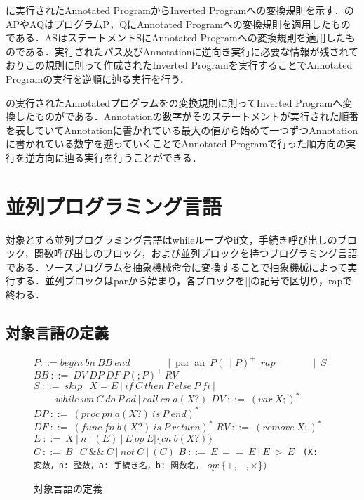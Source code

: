 \documentclass[submit,PRO]{ipsj}
\def\|{\verb|}
\begin{document}
に実行されたAnnotated ProgramからInverted Programへの変換規則を示す．のAPやAQはプログラムP，QにAnnotated Programへの変換規則を適用したものである．ASはステートメントSにAnnotated Programへの変換規則を適用したものである．実行されたパス及びAnnotationに逆向き実行に必要な情報が残されておりこの規則に則って作成されたInverted Programを実行することでAnnotated Programの実行を逆順に辿る実行を行う．




の実行されたAnnotatedプログラムをの変換規則に則ってInverted Programへ変換したものがである．Annotationの数字がそのステートメントが実行された順番を表していてAnnotationに書かれている最大の値から始めて一つずつAnnotationに書かれている数字を遡っていくことでAnnotated Programで行った順方向の実行を逆方向に辿る実行を行うことができる．

%3
\section{並列プログラミング言語}

対象とする並列プログラミング言語はwhileループやif文，手続き呼び出しのブロック，関数呼び出しのブロック，および並列ブロックを持つプログラミング言語である．ソースプログラムを抽象機械命令に変換することで抽象機械によって実行する．並列ブロックはparから始まり，各ブロックを$||$の記号で区切り，rapで終わる．

\subsection{対象言語の定義}
\label{sec:3.1}

\begin{figure}[tb]
\vbox{
\hbox{$P ::= begin\ bn\ BB\ end$}
\hbox{\ \ \ \ \ \ \ $|$ par an $P(\parallel P)^+$ $rap$}
\hbox{\ \ \ \ \ \ \ $|$ $S$}
\hbox{$BB\ ::=\ DV\ DP\ DF\ P(;P)^+\ RV$}
\hbox{$S\ ::=\ skip\ |\  X = E\ |\ if\ C\ then\ P\ else\ P\ fi\ |$}
\hbox{$\ \ \ \ \ \ \ \ \ \  while\ wn\ C\ do\ P\ od\ |\ call\ cn\ a(X?)$}
\hbox{$DV\ ::=\ (var\ X;)^*$}
\hbox{$DP\ ::=\ (proc\ pn\ a(X?)\ is\ P\ end)^*$}
\hbox{$DF\ ::=\ (func\ fn\ b(X?)\ is\ P\ return)^*$}
\hbox{$RV\ ::=\ (remove\ X;)^*$}
\hbox{$E\ ::=\ X\ |\ n\ |\ (E)\ |\ E\ op\ E | \{cn\ b(X?)\}$}
\hbox{$C\ ::=\ B\ |\ C\ \&\& \ C\ |\ not\ C\ |\ (C)$}
\hbox{$B\ ::=\ E\ ==\ E\ |\ E\ >\ E$}
\hbox{\\}
\hbox{\| (X: 変数，n: 整数，a: 手続き名，b: 関数名，|}
\hbox{$op: \{+,-,\times \})$}
}
\centerline{}
\caption{対象言語の定義}
\label{fig:def}
\end{figure}
\end{document}
